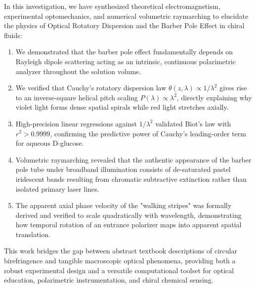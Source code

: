 \documentclass[twocolumn,10pt,a4paper]{article}
\begin{document}
In this investigation, we have synthesized theoretical electromagnetism, experimental optomechanics, and numerical volumetric raymarching to elucidate the physics of Optical Rotatory Dispersion and the Barber Pole Effect in chiral fluids:
\begin{enumerate}[leftmargin=*]
  \item We demonstrated that the barber pole effect fundamentally depends on Rayleigh dipole scattering acting as an intrinsic, continuous polarimetric analyzer throughout the solution volume.
  \item We verified that Cauchy's rotatory dispersion law $\theta(z, \lambda) \propto 1/\lambda^2$ gives rise to an inverse-square helical pitch scaling $P(\lambda) \propto \lambda^2$, directly explaining why violet light forms dense spatial spirals while red light stretches axially.
  \item High-precision linear regressions against $1/\lambda^2$ validated Biot's law with $r^2 > 0.9999$, confirming the predictive power of Cauchy's leading-order term for aqueous D-glucose.
  \item Volumetric raymarching revealed that the authentic appearance of the barber pole tube under broadband illumination consists of de-saturated pastel iridescent bands resulting from chromatic subtractive extinction rather than isolated primary laser lines.
  \item The apparent axial phase velocity of the "walking stripes" was formally derived and verified to scale quadratically with wavelength, demonstrating how temporal rotation of an entrance polarizer maps into apparent spatial translation.
\end{enumerate}
This work bridges the gap between abstract textbook descriptions of circular birefringence and tangible macroscopic optical phenomena, providing both a robust experimental design and a versatile computational toolset for optical education, polarimetric instrumentation, and chiral chemical sensing.
\end{document}
